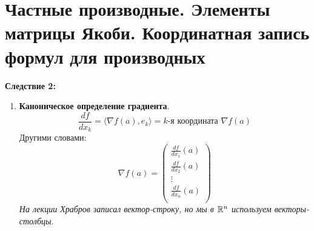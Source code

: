 \section{Частные производные. Элементы матрицы Якоби. Координатная запись формул для производных}


 
\textbf{Следствие 2:}
\begin{enumerate}
    \item[] \textbf{Каноническое определение градиента}.
    $$\frac{df}{dx_k} = \langle \nabla f(a), e_k \rangle =
    \text{$k$-я координата } \nabla f(a)$$
    Другими словами:
    $$ \nabla f(a) =
    \begin{pmatrix*}
        \frac{df}{dx_1}(a) \\
        \frac{df}{dx_2}(a) \\
        \vdots \\
        \frac{df}{dx_n}(a) \\
    \end{pmatrix*}$$
    \textit{На лекции Храбров записал вектор-строку, но мы в $\mathbb{R}^n$ 
    используем векторы-столбцы}.
\end{enumerate}

